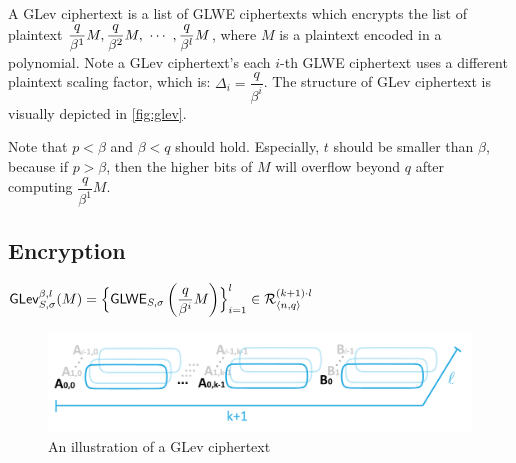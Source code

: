 A GLev ciphertext is a list of GLWE ciphertexts which encrypts the list of plaintext $\dfrac{q}{\beta^1}M, \dfrac{q}{\beta^2}M, \text{ } \text{$\cdots$} \text{ }, \dfrac{q}{\beta^l}M$, where $M$ is a plaintext encoded in a polynomial. Note  a GLev ciphertext's each $i$-th GLWE ciphertext uses a different plaintext scaling factor, which is: $\Delta_i = \dfrac{q}{\beta^i}$. The structure of GLev ciphertext is visually depicted in \autoref{fig:glev}.

Note that $p < \beta$ and $\beta < q$ should hold. Especially, $t$ should be smaller than $\beta$, because if $p > \beta$, then the higher bits of $M$ will overflow beyond $q$ after computing $\dfrac{q}{\beta^1}M$. 

\subsection{Encryption}
\label{subsec:glev-enc}

\begin{tcolorbox}[title={\textbf{\tboxlabel{\ref*{subsec:glev-enc}} GLev Encryption}}]


$\textsf{GLev}_{S, \sigma}^{\beta, l}(M) = \Bigl \{\textsf{GLWE}_{S, \sigma}\left(\dfrac{q}{\beta^i} M\right)  \Bigr \}_{i=1}^{l} \in \mathcal{R}_{\langle n, q \rangle }^{(k+1) \cdot l}$
\end{tcolorbox}

\begin{figure}[h!]
    \centering
  \includegraphics[width=1.0\linewidth]{figures/TFHE-fig2.pdf}
  \caption{An illustration of a GLev ciphertext }
  \label{fig:glev}
\end{figure}


